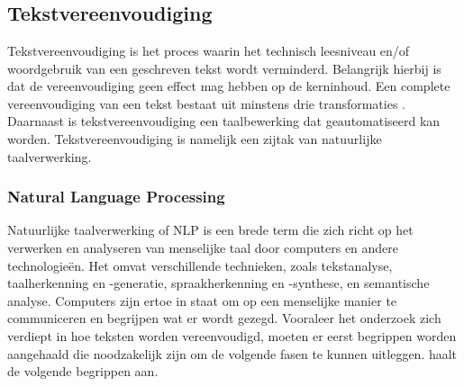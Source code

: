 \chapter{}%
\label{ch:stand-van-zaken}

\section{Tekstvereenvoudiging}

Tekstvereenvoudiging is het proces waarin het technisch leesniveau en/of woordgebruik van een geschreven tekst wordt verminderd. Belangrijk hierbij is dat de vereenvoudiging geen effect mag hebben op de kerninhoud. Een complete vereenvoudiging van een tekst bestaat uit minstens drie transformaties \autocite{Siddharthan2014}. Daarnaast is tekstvereenvoudiging een taalbewerking dat geautomatiseerd kan worden. Tekstvereenvoudiging is namelijk een zijtak van natuurlijke taalverwerking.

\subsection{Natural Language Processing}

Natuurlijke taalverwerking of NLP is een brede term die zich richt op het verwerken en analyseren van menselijke taal door computers en andere technologieën. Het omvat verschillende technieken, zoals tekstanalyse, taalherkenning en -generatie, spraakherkenning en -synthese, en semantische analyse. Computers zijn ertoe in staat om op een menselijke manier te communiceren en begrijpen wat er wordt gezegd. Vooraleer het onderzoek zich verdiept in hoe teksten worden vereenvoudigd, moeten er eerst begrippen worden aangehaald die noodzakelijk zijn om de volgende fasen te kunnen uitleggen. \textcite{Sohom2019} haalt de volgende begrippen aan.


